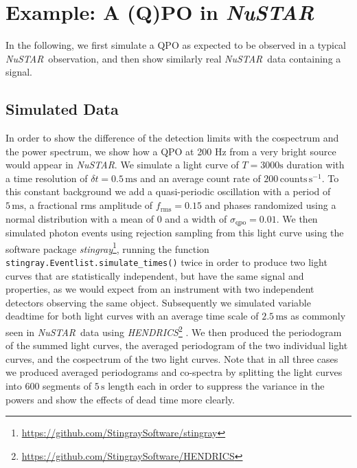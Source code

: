 \documentclass[12pt]{emulateapj}
\newcommand{\project}[1]{\textsl{#1}}
\newcommand{\nustar}{\project{NuSTAR}\xspace}
\begin{document}
\section{Example: A (Q)PO in \nustar}
\label{sec:nustarqpo}

In the following, we first simulate a QPO as expected to be observed in a typical \nustar\ observation, and then show similarly real \nustar\ data containing a signal. 

\subsection{Simulated Data}
In order to show the difference of the detection limits with the cospectrum and the power spectrum, we show how a QPO at 200 Hz from a very bright source would appear in \nustar. We simulate a light curve of $T=3000\mathrm{s}$ duration with a time resolution of $\delta t = 0.5 \,\mathrm{ms}$ and an average count rate of $200 \,\mathrm{counts}\,\mathrm{s}^{-1}$. To this constant background we add a quasi-periodic oscillation with a period of $5\,\mathrm{ms}$, a fractional rms amplitude of $f_\mathrm{rms} = 0.15$ and phases randomized using a normal distribution with a mean of $0$ and a width of $\sigma_\mathrm{qpo} = 0.01$. We then simulated photon events using rejection sampling from this light curve using the software package \textit{stingray}\footnote{\url{https://github.com/StingraySoftware/stingray}}, running the function \texttt{stingray.Eventlist.simulate\_times()} twice in order to produce two light curves that are statistically independent, but have the same signal and properties, as we would expect from an instrument with two independent detectors observing the same object. Subsequently we simulated variable deadtime for both light curves with an average time scale of $2.5 \,\mathrm{ms}$ as commonly seen in \nustar\ data \citep{Bachetti+15} using \textit{HENDRICS}\footnote{\url{https://github.com/StingraySoftware/HENDRICS}} \citep{bachetti2015b}. We then produced the periodogram of the summed light curves, the averaged periodogram of the two individual light curves, and the cospectrum of the two light curves. Note that in all three cases we produced averaged periodograms and co-spectra by splitting the light curves into 600 segments of $5\,\mathrm{s}$ length each in order to suppress the variance in the powers and show the effects of dead time more clearly.
\end{document}
